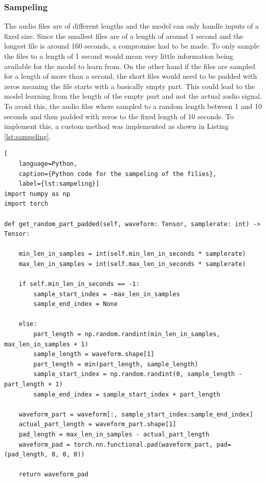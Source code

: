 \subsubsection{Sampeling}
The audio files are of different lengths and the model can only handle inputs of a fixed size.
Since the smallest files are of a length of around 1 second and the longest file is around
160 seconds, a compromise had to be made. To only sample the files to a length of 1 second
would mean very little information being available for the model to learn from. On the other
hand if the files are sampled for a length of more than a second, the short files would need
to be padded with zeros meaning the file starts with a basically empty part. This could lead
to the model learning from the length of the empty part and not the actual audio signal.
To avoid this, the audio files where sampled to a random length between 1 and 10 seconds and
then padded with zeros to the fixed length of 10 seconds. To implement this, a custom method
was implemented as shown in Listing \ref{lst:sampeling}.

\begin{lstlisting}[
    language=Python, 
    caption={Python code for the sampeling of the filies}, 
    label={lst:sampeling}]
import numpy as np
import torch

def get_random_part_padded(self, waveform: Tensor, samplerate: int) -> Tensor:

    min_len_in_samples = int(self.min_len_in_seconds * samplerate)
    max_len_in_samples = int(self.max_len_in_seconds * samplerate)

    if self.min_len_in_seconds == -1:
        sample_start_index = -max_len_in_samples
        sample_end_index = None

    else:
        part_length = np.random.randint(min_len_in_samples, max_len_in_samples + 1)
        sample_length = waveform.shape[1]
        part_length = min(part_length, sample_length)
        sample_start_index = np.random.randint(0, sample_length - part_length + 1)
        sample_end_index = sample_start_index + part_length

    waveform_part = waveform[:, sample_start_index:sample_end_index]
    actual_part_length = waveform_part.shape[1]
    pad_length = max_len_in_samples - actual_part_length
    waveform_pad = torch.nn.functional.pad(waveform_part, pad=(pad_length, 0, 0, 0))

    return waveform_pad
\end{lstlisting}


